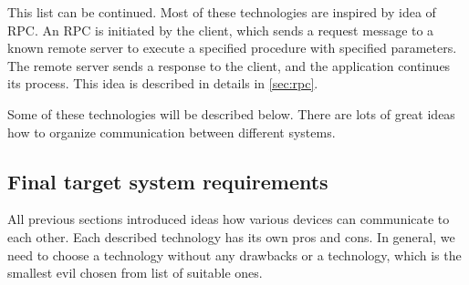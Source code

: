 This list can be continued. Most of these technologies are inspired by idea
of \gls{RPC}. An RPC is initiated by the client, which sends a request
message to a known remote server to execute a specified procedure with specified
parameters. The remote server sends a response to the client, and the application continues its process.
This idea is described in details in \autoref{sec:rpc}.

Some of these technologies will be described below. 
There are lots of great ideas how to organize communication between different systems.














 




%




\subsection{Final target system requirements}

All previous sections introduced ideas how various devices can communicate to
each other. Each described technology has its own pros and cons. In general, we
need to choose a technology without any drawbacks or a technology, which is the
smallest evil chosen from list of suitable ones.


